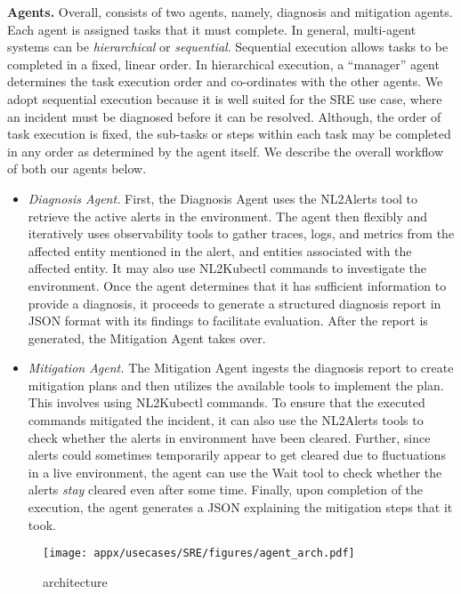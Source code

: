 \textbf{Agents.}  Overall, \lumyn consists of two agents, namely, diagnosis and mitigation agents. Each agent is assigned tasks that it must complete. In general, multi-agent systems can be \textit{hierarchical} or \textit{sequential}. Sequential execution allows tasks to be completed in a fixed, linear order. In hierarchical execution, a ``manager'' agent determines the task execution order and co-ordinates with the other agents. We adopt sequential execution because it is well suited for the SRE use case, where an incident must be diagnosed before it can be resolved. Although, the order of task execution is fixed, the sub-tasks or steps within each task may be completed in any order as determined by the agent itself. We describe the overall workflow of both our agents below.
\begin{itemize}
\item \textit{Diagnosis Agent.} First, the Diagnosis Agent uses the NL2Alerts tool to retrieve the active alerts in the environment. The agent then flexibly and iteratively uses observability tools to gather traces, logs, and metrics from the affected entity mentioned in the alert, and entities associated with the affected entity. It may also use NL2Kubectl commands to investigate the environment. Once the agent determines that it has sufficient information to provide a diagnosis, it proceeds to generate a structured diagnosis report in JSON format with its findings to facilitate evaluation. After the report is generated, the Mitigation Agent takes over.  

\item \textit{Mitigation Agent.} The Mitigation Agent ingests the diagnosis report to create mitigation plans and then utilizes the available tools to implement the plan. This involves using NL2Kubectl commands. To ensure that the executed commands mitigated the incident, it can also use the NL2Alerts tools to check whether the alerts in environment have been cleared. Further, since alerts could sometimes temporarily appear to get cleared due to fluctuations in a live environment, the agent can use the Wait tool to check whether the alerts \textit{stay} cleared even after some time. Finally, upon completion of the execution, the agent generates a JSON explaining the mitigation steps that it took.
\end{itemize}
  


\begin{figure}[h]
    \centering
    \texttt{[image: appx/usecases/SRE/figures/agent\_arch.pdf]}
    \caption{\lumyn architecture}
    \label{fig:agent_arch}
\end{figure}





